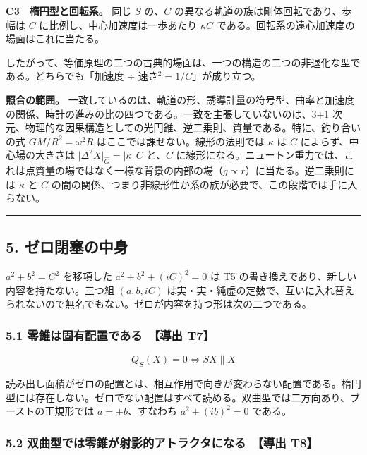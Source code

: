 \documentclass[
  a4paper,
]{ltjsarticle}
\begin{document}
\textbf{C3　楕円型と回転系。} 同じ \(S\) の、\(C\)
の異なる軌道の族は剛体回転であり、歩幅は \(C\)
に比例し、中心加速度は一歩あたり \(\kappa C\)
である。回転系の遠心加速度の場面はこれに当たる。

したがって、等価原理の二つの古典的場面は、一つの構造の二つの非退化な型である。どちらでも「加速度
÷ 速さ\(^2=1/C\)」が成り立つ。

\textbf{照合の範囲。}
一致しているのは、軌道の形、誘導計量の符号型、曲率と加速度の関係、時計の進みの比の四つである。一致を主張していないのは、3+1
次元、物理的な因果構造としての光円錐、逆二乗則、質量である。特に、釣り合いの式
\(GM/R^2=\omega^2R\) はここでは課せない。線形の法則では \(\kappa\) は
\(C\) によらず、中心場の大きさは
\(\lvert\Delta^2X\rvert_{\hat G}=\lvert\kappa\rvert\,C\) と、\(C\)
に線形になる。ニュートン重力では、これは点質量の場ではなく一様な背景の内部の場（\(g\propto r\)）に当たる。逆二乗則には
\(\kappa\) と \(C\)
の間の関係、つまり非線形性か系の族が必要で、この段階では手に入らない。

\begin{center}\rule{0.5\linewidth}{0.5pt}\end{center}

\subsection{5.
ゼロ閉塞の中身}\label{ux30bcux30edux9589ux585eux306eux4e2dux8eab}

\(a^2+b^2=C^2\) を移項した \(a^2+b^2+(iC)^2=0\) は T5
の書き換えであり、新しい内容を持たない。三つ組 \((a,b,iC)\)
は実・実・純虚の定数で、互いに入れ替えられないので無名でもない。ゼロが内容を持つ形は次の二つである。

\subsubsection{5.1 零錐は固有配置である　【導出
T7】}\label{ux96f6ux9310ux306fux56faux6709ux914dux7f6eux3067ux3042ux308b-ux5c0eux51fa-t7}

\[
Q_S(X)=0\iff SX\parallel X
\]

読み出し面積がゼロの配置とは、相互作用で向きが変わらない配置である。楕円型には存在しない。ゼロでない配置はすべて読める。双曲型では二方向あり、ブーストの正規形では
\(a=\pm b\)、すなわち \(a^2+(ib)^2=0\) である。

\subsubsection{5.2 双曲型では零錐が射影的アトラクタになる　【導出
T8】}\label{ux53ccux66f2ux578bux3067ux306fux96f6ux9310ux304cux5c04ux5f71ux7684ux30a2ux30c8ux30e9ux30afux30bfux306bux306aux308b-ux5c0eux51fa-t8}
\end{document}
